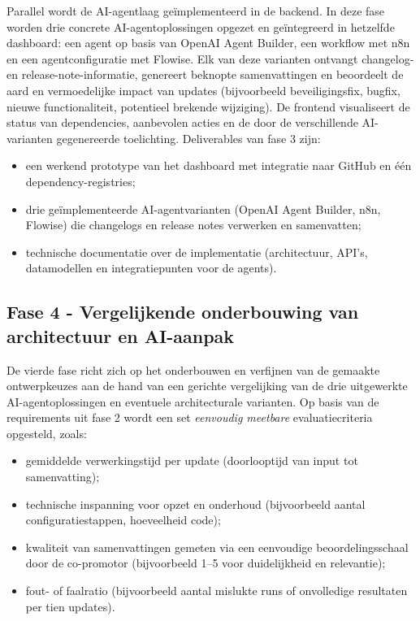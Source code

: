 Parallel wordt de AI-agentlaag geïmplementeerd in de backend. In deze fase worden drie concrete AI-agentoplossingen opgezet en geïntegreerd in hetzelfde dashboard: een agent op basis van OpenAI Agent Builder, een workflow met n8n en een agentconfiguratie met Flowise. Elk van deze varianten ontvangt changelog- en release-note-informatie, genereert beknopte samenvattingen en beoordeelt de aard en vermoedelijke impact van updates (bijvoorbeeld beveiligingsfix, bugfix, nieuwe functionaliteit, potentieel brekende wijziging). De frontend visualiseert de status van dependencies, aanbevolen acties en de door de verschillende AI-varianten gegenereerde toelichting. Deliverables van fase 3 zijn:
\begin{itemize}
  \item een werkend prototype van het dashboard met integratie naar GitHub en één dependency-registries;
  \item drie geïmplementeerde AI-agentvarianten (OpenAI Agent Builder, n8n, Flowise) die changelogs en release notes verwerken en samenvatten;
  \item technische documentatie over de implementatie (architectuur, API’s, datamodellen en integratiepunten voor de agents).
\end{itemize}

\subsection{Fase 4 - Vergelijkende onderbouwing van architectuur en AI-aanpak}
\label{sec:fase4}

De vierde fase richt zich op het onderbouwen en verfijnen van de gemaakte ontwerpkeuzes aan de hand van een gerichte vergelijking van de drie uitgewerkte AI-agentoplossingen en eventuele architecturale varianten. Op basis van de requirements uit fase 2 wordt een set \emph{eenvoudig meetbare} evaluatiecriteria opgesteld, zoals:
\begin{itemize}
  \item gemiddelde verwerkingstijd per update (doorlooptijd van input tot samenvatting);
  \item technische inspanning voor opzet en onderhoud (bijvoorbeeld aantal configuratiestappen, hoeveelheid code);
  \item kwaliteit van samenvattingen gemeten via een eenvoudige beoordelingsschaal door de co-promotor (bijvoorbeeld 1–5 voor duidelijkheid en relevantie);
  \item fout- of faalratio (bijvoorbeeld aantal mislukte runs of onvolledige resultaten per tien updates).
\end{itemize}

